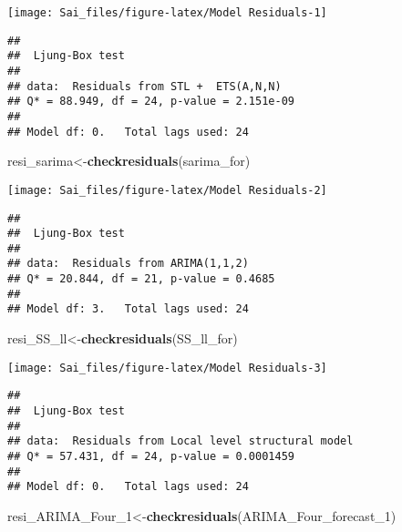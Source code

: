 \documentclass[
]{article}
\newenvironment{Shaded}{\begin{snugshade}}{\end{snugshade}}
\newcommand{\FunctionTok}[1]{\textcolor[rgb]{0.13,0.29,0.53}{\textbf{#1}}}
\newcommand{\NormalTok}[1]{#1}
\newcommand{\OtherTok}[1]{\textcolor[rgb]{0.56,0.35,0.01}{#1}}
\begin{document}
\begin{center}\texttt{[image: Sai\_files/figure-latex/Model Residuals-1]} \end{center}

\begin{verbatim}
## 
##  Ljung-Box test
## 
## data:  Residuals from STL +  ETS(A,N,N)
## Q* = 88.949, df = 24, p-value = 2.151e-09
## 
## Model df: 0.   Total lags used: 24
\end{verbatim}

\begin{Shaded}
\begin{Highlighting}[]
\NormalTok{resi\_sarima}\OtherTok{\textless{}{-}}\FunctionTok{checkresiduals}\NormalTok{(sarima\_for)}
\end{Highlighting}
\end{Shaded}

\begin{center}\texttt{[image: Sai\_files/figure-latex/Model Residuals-2]} \end{center}

\begin{verbatim}
## 
##  Ljung-Box test
## 
## data:  Residuals from ARIMA(1,1,2)
## Q* = 20.844, df = 21, p-value = 0.4685
## 
## Model df: 3.   Total lags used: 24
\end{verbatim}

\begin{Shaded}
\begin{Highlighting}[]
\NormalTok{resi\_SS\_ll}\OtherTok{\textless{}{-}}\FunctionTok{checkresiduals}\NormalTok{(SS\_ll\_for)}
\end{Highlighting}
\end{Shaded}

\begin{center}\texttt{[image: Sai\_files/figure-latex/Model Residuals-3]} \end{center}

\begin{verbatim}
## 
##  Ljung-Box test
## 
## data:  Residuals from Local level structural model
## Q* = 57.431, df = 24, p-value = 0.0001459
## 
## Model df: 0.   Total lags used: 24
\end{verbatim}

\begin{Shaded}
\begin{Highlighting}[]
\NormalTok{resi\_ARIMA\_Four\_1}\OtherTok{\textless{}{-}}\FunctionTok{checkresiduals}\NormalTok{(ARIMA\_Four\_forecast\_1)}
\end{Highlighting}
\end{Shaded}
\end{document}
